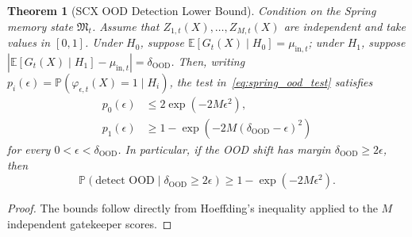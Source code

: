 \documentclass[11pt,a4paper]{article}
\newtheorem{theorem}{Theorem}[section]
\theoremstyle{definition}
\newcommand{\E}{\mathbb{E}}
\newcommand{\Pbb}{\mathbb{P}}
\begin{document}
\begin{theorem}[SCX OOD Detection Lower Bound]
\label{thm:spring_ood_lower}
Condition on the Spring memory state $\mathfrak{M}_t$.  Assume that
$Z_{1,t}(X),\ldots,Z_{M,t}(X)$ are independent and take values in $[0,1]$.
Under $H_0$, suppose $\E[G_t(X)\mid H_0]=\mu_{\mathrm{in},t}$; under $H_1$,
suppose
$|\E[G_t(X)\mid H_1]-\mu_{\mathrm{in},t}|=\delta_{\mathrm{OOD}}$.
Then, writing
$p_i(\epsilon)=\Pbb(\varphi_{\epsilon,t}(X)=1\mid H_i)$, the test
in~\eqref{eq:spring_ood_test} satisfies
\begin{align}
  p_0(\epsilon)
    &\le 2\exp(-2M\epsilon^2), \label{eq:ood_false_alarm}\\
  p_1(\epsilon)
    &\ge
    1-\exp\!\left(-2M(\delta_{\mathrm{OOD}}-\epsilon)^2\right)
    \label{eq:ood_power_exact}
\end{align}
for every $0<\epsilon<\delta_{\mathrm{OOD}}$.  In particular, if the OOD
shift has margin $\delta_{\mathrm{OOD}}\ge 2\epsilon$, then
\begin{equation}
  \Pbb(\text{detect OOD}\mid \delta_{\mathrm{OOD}}\ge 2\epsilon)
  \ge 1-\exp(-2M\epsilon^2).
  \label{eq:ood_power_margin}
\end{equation}
\end{theorem}

\begin{proof}
The bounds follow directly from Hoeffding's inequality applied to the
$M$ independent gatekeeper scores.
\end{proof}
\end{document}
